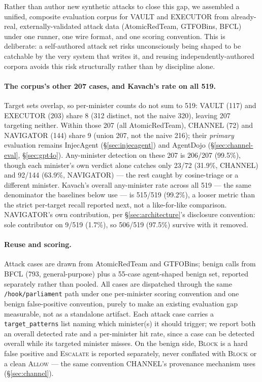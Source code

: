 Rather than author new synthetic attacks to close this gap, we assembled a
unified, composite evaluation corpus for VAULT and EXECUTOR from
already-real, externally-validated attack data (AtomicRedTeam, GTFOBins,
BFCL) under one runner, one wire format, and one scoring convention. This
is deliberate: a self-authored attack set risks unconsciously being shaped
to be catchable by the very system that writes it, and reusing
independently-authored corpora avoids this risk structurally rather than
by discipline alone.

\paragraph{The corpus's other 207 cases, and Kavach's rate on all 519.}
Target sets overlap, so per-minister counts do not sum to 519: VAULT
(117) and EXECUTOR (203) share 8 (312 distinct, not the naive 320),
leaving 207 targeting neither. Within those 207 (all AtomicRedTeam),
CHANNEL (72) and NAVIGATOR (144) share 9 (union 207, not the naive 216);
their \emph{primary} evaluation remains
InjecAgent (\S\ref{sec:injecagent}) and AgentDojo (\S\ref{sec:channel-eval},
\S\ref{sec:gpt4o}). Any-minister detection on these 207 is 206/207
(99.5\%), though each minister's own verdict alone catches only 23/72
(31.9\%, CHANNEL) and 92/144 (63.9\%, NAVIGATOR) --- the rest caught by
cosine-triage or a different minister. Kavach's overall any-minister rate
across all 519 --- the same denominator the baselines below use --- is
515/519 (99.2\%), a looser metric than the strict per-target recall
reported next, not a like-for-like comparison. NAVIGATOR's own
contribution, per \S\ref{sec:architecture}'s disclosure convention: sole
contributor on 9/519 (1.7\%), so 506/519 (97.5\%) survive with it removed.

\paragraph{Reuse and scoring.} Attack cases are drawn from AtomicRedTeam
and GTFOBins; benign calls from BFCL (793, general-purpose) plus a
55-case agent-shaped benign set, reported separately rather than pooled.
All cases are dispatched through the same \texttt{/hook/parliament} path
under one per-minister scoring convention and one benign false-positive
convention, purely to make an existing evaluation gap measurable, not as
a standalone artifact. Each attack case carries a \texttt{target\_patterns} list
naming which minister(s) it should trigger; we report both an overall
detected rate and a per-minister hit rate, since a case can be detected
overall while its targeted minister misses. On the benign side,
\textsc{Block} is a hard false positive and \textsc{Escalate} is reported
separately, never conflated with \textsc{Block} or a clean
\textsc{Allow} --- the same convention CHANNEL's provenance mechanism uses
(\S\ref{sec:channel}).

